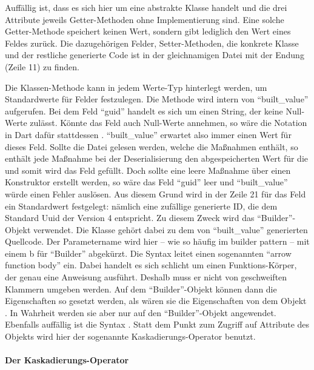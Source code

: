 Auffällig ist, dass es sich hier um eine abstrakte Klasse handelt und die drei Attribute jeweils Getter-Methoden ohne Implementierung sind.
Eine solche Getter-Methode speichert keinen Wert, sondern gibt lediglich den Wert eines Feldes zurück.
Die dazugehörigen Felder,  Setter-Methoden, die konkrete Klasse und der restliche generierte Code ist in der gleichnamigen Datei mit der Endung  (Zeile 11) zu finden.

Die Klassen-Methode  kann in jedem Werte-Typ hinterlegt werden, um Standardwerte für Felder festzulegen.
Die Methode wird intern von \enquote{built_value} aufgerufen.
Bei dem Feld \enquote{guid} handelt es sich um einen String, der keine Null-Werte zulässt.
Könnte das Feld auch Null-Werte annehmen, so wäre die Notation in Dart dafür stattdessen . \enquote{built_value} erwartet also immer einen Wert für dieses Feld. Sollte die Datei gelesen werden, welche die Maßnahmen enthält, so enthält jede Maßnahme bei der Deserialisierung den abgespeicherten Wert für die  und somit wird das Feld gefüllt. Doch sollte eine leere Maßnahme über einen Konstruktor erstellt werden, so wäre das Feld \enquote{guid} leer und \enquote{built_value} würde einen Fehler auslösen. Aus diesem Grund wird in der Zeile 21 für das Feld  ein Standardwert festgelegt: nämlich eine zufällige generierte ID, die dem Standard Uuid der Version 4 entspricht.
Zu diesem Zweck wird das \enquote{Builder}-Objekt verwendet.
Die Klasse  gehört dabei zu dem von \enquote{built_value} generierten Quellcode.
Der Parametername wird hier – wie so häufig im builder pattern – mit einem b für \enquote{Builder} abgekürzt.
Die Syntax \IC{=>} leitet  einen sogenannten \enquote{arrow function body} ein.
Dabei handelt es sich schlicht um einen Funktions-Körper, der genau eine Anweisung ausführt. Deshalb muss er nicht von geschweiften Klammern umgeben werden.
Auf dem \enquote{Builder}-Objekt können dann die Eigenschaften so gesetzt werden, als wären sie die Eigenschaften von dem Objekt .
In Wahrheit werden sie aber nur auf den \enquote{Builder}-Objekt angewendet.  Ebenfalls auffällig ist die Syntax .  Statt dem Punkt zum Zugriff auf Attribute des Objekts wird hier der sogenannte Kaskadierungs-Operator benutzt.

\paragraph{Der Kaskadierungs-Operator}

